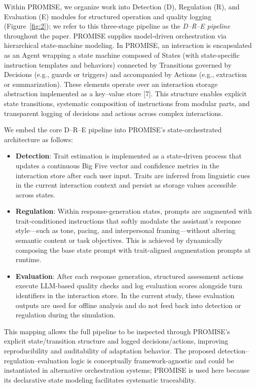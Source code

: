 Within PROMISE, we organize work into Detection (D), Regulation (R), and Evaluation (E) modules for structured operation and quality logging (Figure~\ref{fig:2}); we refer to this three-stage pipeline as the \emph{D--R--E pipeline} throughout the paper. PROMISE supplies model-driven orchestration via hierarchical state-machine modeling. In PROMISE, an interaction is encapsulated as an Agent wrapping a state machine composed of States (with state-specific instruction templates and behaviors) connected by Transitions governed by Decisions (e.g., guards or triggers) and accompanied by Actions (e.g., extraction or summarization). These elements operate over an interaction storage abstraction implemented as a key--value store {[}7{]}. This structure enables explicit state transitions, systematic composition of instructions from modular parts, and transparent logging of decisions and actions across complex interactions.

We embed the core D--R--E pipeline into PROMISE's state-orchestrated architecture as follows:

\begin{itemize}
\item
  \textbf{Detection}: Trait estimation is implemented as a state-driven process that updates a continuous Big Five vector and confidence metrics in the interaction store after each user input. Traits are inferred from linguistic cues in the current interaction context and persist as storage values accessible across states.
\item
  \textbf{Regulation}: Within response-generation states, prompts are augmented with trait-conditioned instructions that softly modulate the assistant's response style---such as tone, pacing, and interpersonal framing---without altering semantic content or task objectives. This is achieved by dynamically composing the base state prompt with trait-aligned augmentation prompts at runtime.
\item
  \textbf{Evaluation}: After each response generation, structured assessment actions execute LLM-based quality checks and log evaluation scores alongside turn identifiers in the interaction store. In the current study, these evaluation outputs are used for offline analysis and do not feed back into detection or regulation during the simulation.
\end{itemize}

This mapping allows the full pipeline to be inspected through PROMISE's explicit state/transition structure and logged decisions/actions, improving reproducibility and auditability of adaptation behavior. The proposed detection--regulation--evaluation logic is conceptually framework-agnostic and could be instantiated in alternative orchestration systems; PROMISE is used here because its declarative state modeling facilitates systematic traceability.

